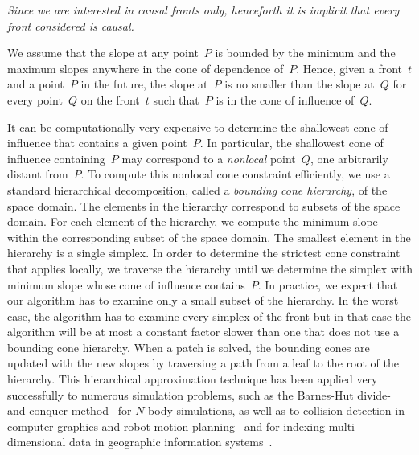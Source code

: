 \documentclass[twocolumn]{article}
\def\fp{\ensuremath{P}}
\def\fq{\ensuremath{Q}}
\begin{document}
\emph{Since we are interested in causal fronts only, henceforth it is
  implicit that every front considered is causal.}

We assume that the slope at any point~$\fp$ is bounded by the minimum
and the maximum slopes anywhere in the cone of dependence of~$\fp$.
Hence, given a front~$t$ and a point~$\fp$ in the future, the slope
at~$\fp$ is no smaller than the slope at~$\fq$ for every point~$\fq$
on the front~$t$ such that~$\fp$ is in the cone of influence of~$\fq$.

It can be computationally very expensive to determine the shallowest
cone of influence that contains a given point~$\fp$.  In particular,
the shallowest cone of influence containing~$\fp$ may correspond to a
\emph{nonlocal} point~$\fq$, one arbitrarily distant from~$\fp$.  To
compute this nonlocal cone constraint efficiently, we use a standard
hierarchical decomposition, called a \emph{bounding cone hierarchy},
of the space domain.  The elements in the hierarchy correspond to
subsets of the space domain.  For each element of the hierarchy, we
compute the minimum slope within the corresponding subset of the space
domain.  The smallest element in the hierarchy is a single simplex.
In order to determine the strictest cone constraint that applies
locally, we traverse the hierarchy until we determine the simplex with
minimum slope whose cone of influence contains~$\fp$.  In practice, we
expect that our algorithm has to examine only a small subset of the
hierarchy.  In the worst case, the algorithm has to examine every
simplex of the front but in that case the algorithm will be at most a
constant factor slower than one that does not use a bounding cone
hierarchy.  When a patch is solved, the bounding cones are updated
with the new slopes by traversing a path from a leaf to the root of
the hierarchy.  This hierarchical approximation technique has been
applied very successfully to numerous simulation problems, such as the
Barnes-Hut divide-and-conquer method~\cite{barnes-hut86nbody} for
$N$-body simulations, as well as to collision detection in computer
graphics and robot motion planning~\cite{lin96collision} and for
indexing multi-dimensional data in geographic information
systems~\cite{guttman84rtrees}.

\iffalse
In Section~\ref{sec:1d}, we describe the problem and our solution for
the case of one-dimensional space domains.  Several aspects of the
complexity of the problem are evident even in the 1D$\times$Time case.
In Section~\ref{sec:2d}, we describe our algorithm for planar space
domains.  We describe sufficient conditions such that the front at
every step is guaranteed to make progress.  Finally, we conclude by
comparing our results to previous work on the uniform wavespeed case.
\fi
\end{document}
